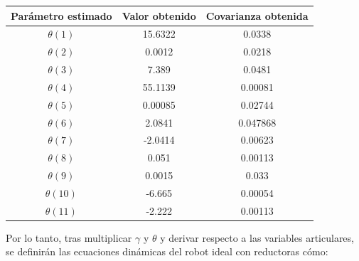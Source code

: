 \begin{center}
	\begin{tabular}{| c | c | c |}
		\hline
		Parámetro estimado & Valor obtenido & Covarianza obtenida \\
		\hline
		$\theta(1) $ & 15.6322 & 0.0338 \\
		\hline
		$\theta(2) $ & 0.0012 & 0.0218 \\
		\hline
		$\theta(3) $ & 7.389 & 0.0481 \\
		\hline
		$\theta(4) $ & 55.1139 & 0.00081 \\
		\hline
		$\theta(5) $ & 0.00085 & 0.02744 \\
		\hline
		$\theta(6) $ & 2.0841 & 0.047868 \\
		\hline
		$\theta(7) $ & -2.0414 & 0.00623 \\
		\hline
		$\theta(8) $ & 0.051 & 0.00113 \\
		\hline
		$\theta(9) $ & 0.0015 & 0.033 \\
		\hline
		$\theta(10) $ & -6.665 & 0.00054 \\
		\hline
		$\theta(11) $ & -2.222 & 0.00113 \\
		\hline
	\end{tabular}

\end{center}

Por lo tanto, tras multiplicar $\gamma$ y $\theta$ y derivar respecto a las variables articulares, se definirán las ecuaciones dinámicas del robot ideal con reductoras cómo:\\

